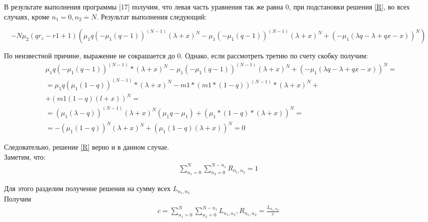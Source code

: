 В результате выполнения программы [17] получим, что левая часть уравнения так же равна 0, при подстановки решения \eqref{R}, во всех случаях, кроме $n_{1}=0, n_{2}=N$.
Результат выполнения следующий:
\begin{adjustwidth}{-40pt}{100pt}
\begin{equation*}
-N\mu_{2}(qr_{z} - r{1} + 1)(\mu_{1}q(-\mu_{1}(q - 1))^{(N - 1)}(\lambda + x)^N - \mu_{1}(-\mu_{1}(q -1))^{(N - 1)}(\lambda + x)^N + (-\mu_{1}(\lambda q - \lambda + qx - x))^N)
\end{equation*}
\end{adjustwidth}
По неизвестной причине, выражение не сокрашается до 0. Однако, если рассмотреть третию по счету скобку получим:\\
\begin{align*}
	&\mu_{1}q(-\mu_{1}(q - 1))^{(N - 1)}*(\lambda + x)^N - \mu_{1}(-\mu_{1}(q - 1))^{(N - 1)}(\lambda + x)^N + (-\mu_{1}(\lambda q - \lambda + qx - x))^N=\\
	&=\mu_{1}q(\mu_{1}(1-q))^{(N - 1)}*(\lambda + x)^N - m1*(m1*(1-q))^(N - 1)*(\lambda + x)^N+\\
	& + (m1(1-q)(l+x))^N=\\
	&=(\mu_{1}(\lambda-q))^{(N - 1)}(\lambda + x)^N(\mu_{1}q - \mu_{1}) + (\mu_{1}*(1-q)*(\lambda+x))^N=\\
	&=-(\mu_{1}(1-q))^N(\lambda + x)^N + (\mu_{1}(1-q)(\lambda+x))^N=0
\end{align*}

Следовательно, решение \eqref{R} верно и в данном случае.\\
Заметим, что:\\
\begin{align*}
\sum_{n_{1}=0}^{N}\sum_{n_{2}=0}^{N-n_{1}}R_{n_{1},n_{2}}=1
\end{align*}

Для этого разделим полученне решения на сумму всех $L_{n_{1}, n_{2}}$\\
Получим 
\begin{equation*}
	\begin{split} 
		c=\sum_{n_1=0}^N\sum_{n_2=0}^{N-n_1} L_{n_{1}, n_{2}}, R_{n_{1}, n_{2}}=\frac{L_{n_{1}, n_{2}}}{c}
	\end{split}
\end{equation*}